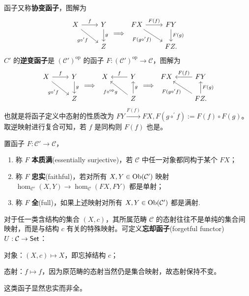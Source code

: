 函子又称\textbf{协变函子}，图解为
\[
\begin{tikzcd}
X \arrow[r,"f"] \arrow[dr,"g\circ^{\prime} f"'] & Y \arrow[d,"g"] \\
& Z
\end{tikzcd}
\im
\begin{tikzcd}
FX \arrow[r,"F(f)"] \arrow[dr,"F(g\circ^{\prime} f)"'] & FY \arrow[d,"F(g)"] \\
& FZ.
\end{tikzcd}
\]
$C'$ 的\textbf{逆变函子}是 $(\mathcal{C}')^\mathrm{op}$ 的函子 $F: (\mathcal{C}')^\mathrm{op} \to \mathcal{C}$，图解为
\[
\begin{tikzcd}
X \arrow[r,"f"] \arrow[dr,"g\circ^\prime f"'] & Y \arrow[d,"g"] \\
& Z
\end{tikzcd}
\im
\begin{tikzcd}
X & Y \arrow[l,"f"'] \\
& Z \arrow[u,"g"'] \arrow[ul,"f\circ^\mathrm{op} g"]
\end{tikzcd}
\im
\begin{tikzcd}
FX & FY \arrow[l,"F(f)"'] \\
& FZ.\arrow[u,"F(g)"'] \arrow[ul,"F(g\circ^\prime f)"]
\end{tikzcd}
\]
也就是将函子定义中态射的性质改为 $FY\xrightarrow{F(f)} FX,F(g\circ^\prime f) := F(f) \circ F(g)$。
取逆映射进行复合可知，若 $f$ 是同构则 $F(f)$ 也是。

\begin{definition}
	置函子 $F:  \mathcal{C}' \to \mathcal{C}$，
	\begin{enumerate}
		\item 称 $F$ \textbf{本质满}(essentially surjective)，若 $\mathcal{C}$ 中任一对象都同构于某个 $FX$；
		\item 称 $F$ \textbf{忠实}(faithful)，若对所有 $X, Y \in \operatorname{Ob}(\mathcal{C}')$ 映射 $\hom_{\mathcal{C}'}(X, Y) \to \hom_{\mathcal{C}}(FX, FY) $ 都是单射；
		\item 称 $F$ \textbf{全}(full)，如果上述映射对所有 $X, Y \in \operatorname{Ob}(\mathcal{C}')$ 都是满射.
	\end{enumerate}
\end{definition}

对于任一类含结构的集合 $(X,c)$，其所属范畴 $\mathcal{C}$ 的态射往往不是单纯的集合间映射，而是与结构 $c$ 有关的特殊映射。可定义\textbf{忘却函子}(forgetful functor) $U:\mathcal{C} \to \mathsf{Set}$：
\begin{compactitem}
	\item 对象：$(X,c)\mapsto X$，即忘掉结构 $c$；
	\item 态射：$f\mapsto f$，因为原范畴的态射当然仍是集合映射，故态射保持不变。
\end{compactitem}
这类函子显然忠实而非全。

